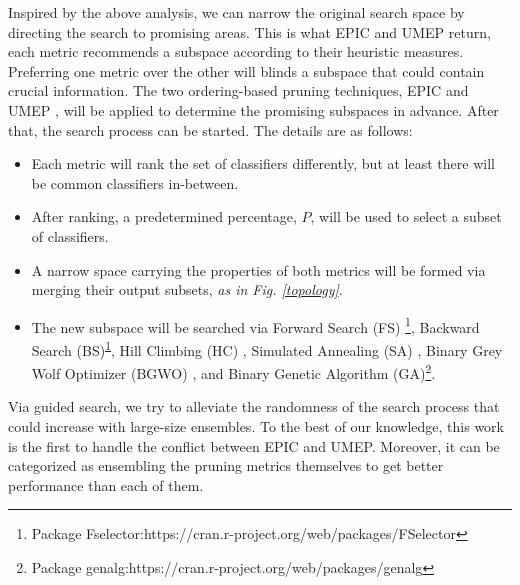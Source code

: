 Inspired by the above analysis, we can narrow the original search space by directing the search to promising areas. This is what EPIC and UMEP  return, each metric recommends a subspace according to their heuristic measures. Preferring one metric over the other will blinds a subspace that could contain crucial information. The two ordering-based pruning techniques, EPIC \cite{lu2010} and UMEP \cite{guo2013}, will be applied to determine the promising subspaces in advance. After that, the search process can be started. The details are as follows: 
 
 \begin{itemize}[nosep]
\item Each metric will rank the set of classifiers differently, but at least there will be common classifiers in-between.
 \item After ranking, a predetermined percentage, $P$, will be used to select a subset of classifiers. 
 \item A narrow space carrying the properties of both metrics will be formed via merging their output subsets, \textit{as in Fig. \ref{topology}}.
 \item The new subspace will be searched via Forward Search (FS) \footnote{Package Fselector:https://cran.r-project.org/web/packages/FSelector\label{fselect}}, Backward Search (BS)\textsuperscript{\ref{fselect}}, Hill Climbing (HC) \cite{cortez2014}, Simulated Annealing (SA) \cite{cortez2014}, Binary Grey Wolf Optimizer (BGWO) \cite{emary2016}, and Binary Genetic Algorithm (GA)\footnote{Package genalg:https://cran.r-project.org/web/packages/genalg}.    
 \end{itemize} 


Via guided search, we try to alleviate the randomness of the search process that could increase with large-size ensembles. To the best of our knowledge, this work is the first to handle the conflict between EPIC and UMEP. Moreover, it can be categorized as ensembling the pruning metrics themselves to get better performance than each of them.